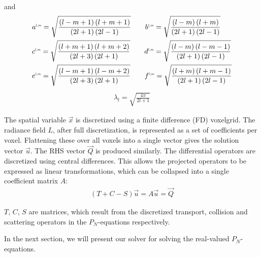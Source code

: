 and
\begin{align*}
&
a^{\scaleto{l,m}{4pt}}= \sqrt{\frac{\left(l-m+1\right)\left(l+m+1\right)}{\left(2l+1\right)\left(2l-1\right)}} \qquad
b^{\scaleto{l,m}{4pt}}= \sqrt{\frac{\left(l-m\right)\left(l+m\right)}{\left(2l+1\right)\left(2l-1\right)}}
\\&
c^{\scaleto{l,m}{4pt}}= \sqrt{\frac{\left(l+m+1\right)\left(l+m+2\right)}{\left(2l+3\right)\left(2l+1\right)}} \qquad
d^{\scaleto{l,m}{4pt}}= \sqrt{\frac{\left(l-m\right)\left(l-m-1\right)}{\left(2l+1\right)\left(2l-1\right)}}
\\&
e^{\scaleto{l,m}{4pt}}= \sqrt{\frac{\left(l-m+1\right)\left(l-m+2\right)}{\left(2l+3\right)\left(2l+1\right)}} \qquad
f^{\scaleto{l,m}{4pt}}= \sqrt{\frac{\left(l+m\right)\left(l+m-1\right)}{\left(2l+1\right)\left(2l-1\right)}}
\end{align*}
\begin{align*}
\lambda_l=\sqrt{\frac{4\pi}{2l+1}}
\end{align*}

\begin{figure}[h]
\centering
{}
\vspace{-0.2in}
\end{figure}

\begin{figure*}[t]
\centering
{}
\vspace{-0.2in}
\label{fig:pnsolver}
\end{figure*}

The spatial variable $\vec{x}$ is discretized using a finite difference (FD) voxelgrid. The radiance field $L$, after full discretization, is represented as a set of coefficients per voxel. Flattening these over all voxels into a single vector gives the solution vector $\vec{u}$. The RHS vector $\vec{Q}$ is produced similarly. The differential operators are discretized using central differences. This allows the projected operators to be expressed as linear transformations, which can be collapsed into a single coefficient matrix $A$:
\begin{align}
(T+C-S)\vec{u} = A\vec{u} = \vec{Q}
\end{align}

$T$, $C$, $S$ are matrices, which result from the discretized transport, collision and scattering operators in the $P_N$-equations respectively.



In the next section, we will present our solver for solving the real-valued $P_N$-equations. 

